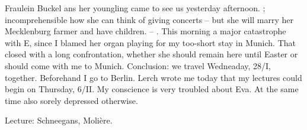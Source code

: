 
Fraulein Buckel ans her youngling came to see us yesterday afternoon. ; incomprehensible how she can think of giving concerts -- but she will marry her Mecklenburg farmer and have children. -- \missing. This morning a major catastrophe with E, since I blamed her organ playing for my too-short stay in Munich. That closed with a long confrontation, whether she should remain here until Easter or should come with me to Munich. Conclusion: we travel Wedneaday, 28/I, together. Beforehand I go to Berlin. Lerch wrote me today that my lectures could begin on Thursday, 6/II. My conscience is very troubled about Eva. At the same time also sorely depressed otherwise.

Lecture: Schneegans, Molière.